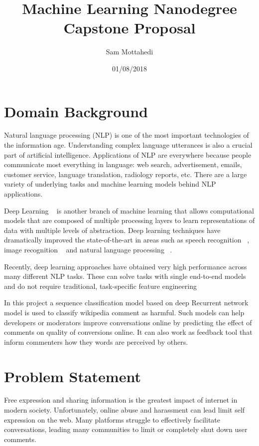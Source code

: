 \documentclass{article}
\title{Machine Learning Nanodegree \\ Capstone Proposal}
\author{Sam Mottahedi}
\date{01/08/2018}
\begin{document}
        \maketitle


\section{Domain Background}

Natural language processing (NLP) is one of the most important technologies of the information age. Understanding complex language utterances is also a crucial part of artificial intelligence. Applications of NLP are everywhere because people communicate most everything in language: web search, advertisement, emails, customer service, language translation, radiology reports, etc. There are a large variety of underlying tasks and machine learning models behind NLP applications.

Deep Learning ~\citep{LeCun2015Nature} is another branch of machine learning that allows
computational models that are composed of multiple processing layers to learn representations of
data with multiple levels of abstraction.  Deep learning techniques have dramatically improved the
state-of-the-art in areas such as speech recognition ~\citep{Hinton2012Speech}, image
recognition ~\citep{Krizhevsky2012ImageNet} and natural language processing ~\citep{Colbert2012}.


Recently, deep learning approaches have obtained very high performance across many different NLP tasks. These can solve tasks with single end-to-end models and do not require traditional, task-specific feature engineering


In this project a sequence classification model based on deep Recurrent network model is used to classify wikipedia comment as harmful. Such models can help developers or moderators improve conversations online by predicting the effect of comments on quality of conversions online. It can also work as feedback tool that inform commenters how they words are perceived by others.


\section{Problem Statement}

Free expression and sharing information is the greatest impact of internet in modern society. Unfortunately, online abuse and harassment can lead limit self expression on the web. Many platforms struggle to effectively
facilitate conversations, leading many communities to limit or
completely shut down user comments.
\end{document}
